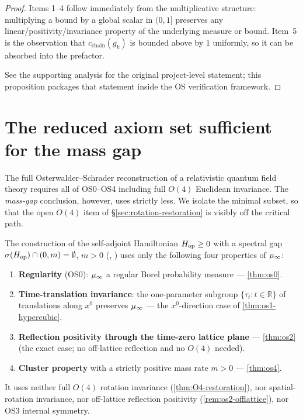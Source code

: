\begin{proof}
Items 1--4 follow immediately from the multiplicative structure:
multiplying a bound by a global scalar in $(0, 1]$ preserves any
linear/positivity/invariance property of the underlying measure or
bound.  Item~5 is the observation that $c_{\mathrm{chain}}(g_k)$ is
bounded above by 1 uniformly, so it can be absorbed into the
prefactor.

See the supporting analysis for the original
project-level statement; this proposition packages that statement
inside the OS verification framework.
\end{proof}

\section{The reduced axiom set sufficient for the mass gap}
\label{sec:reduced-axioms}

The full Osterwalder--Schrader reconstruction of a relativistic
quantum field theory requires all of OS0--OS4 including full
$O(4)$ Euclidean invariance.  The \emph{mass-gap} conclusion, however,
uses strictly less.  We isolate the minimal subset, so that the open
$O(4)$ item of \S\ref{sec:rotation-restoration} is visibly off the
critical path.

\begin{theorem}
\label{thm:reduced-axioms}
The construction of the self-adjoint Hamiltonian $H_{\mathrm{op}} \ge 0$ with a
spectral gap $\sigma(H_{\mathrm{op}}) \cap (0, m) = \emptyset$, $m > 0$
(, ) uses only
the following four properties of $\mu_\infty$:
\begin{enumerate}
  \item[\textnormal{(R0)}] \textbf{Regularity} (OS0): $\mu_\infty$ a
    regular Borel probability measure --- \cref{thm:os0}.
  \item[\textnormal{(R1)}] \textbf{Time-translation invariance}: the
    one-parameter subgroup $\{\tau_t : t \in \mathbb{R}\}$ of
    translations along $x^0$ preserves $\mu_\infty$ --- the
    $x^0$-direction case of \cref{thm:os1-hypercubic}.
  \item[\textnormal{(R2)}] \textbf{Reflection positivity through the
    time-zero lattice plane} --- \cref{thm:os2} (the exact case; no
    off-lattice reflection and no $O(4)$ needed).
  \item[\textnormal{(R4)}] \textbf{Cluster property} with a strictly
    positive mass rate $m > 0$ --- \cref{thm:os4}.
\end{enumerate}
It uses neither full $O(4)$ rotation invariance
(\cref{thm:O4-restoration}), nor spatial-rotation invariance, nor
off-lattice reflection positivity (\cref{rem:os2-offlattice}), nor
OS3 internal symmetry.
\end{theorem}

